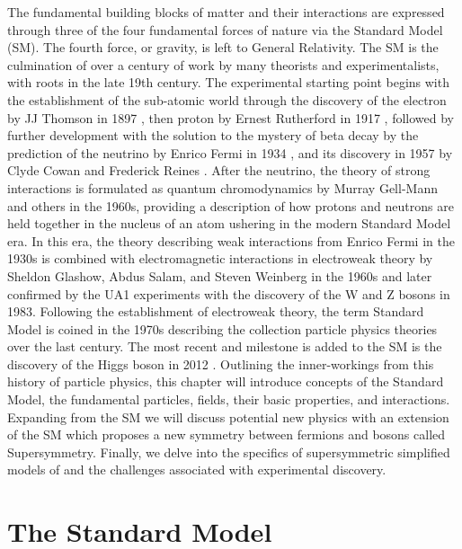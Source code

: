 The fundamental building blocks of matter and their interactions are expressed through three of the four fundamental forces of nature via the Standard Model (SM). The fourth force, or gravity, is left to General Relativity. The SM  is the culmination of over a century of work by many theorists and experimentalists, with roots in the late 19th century. The experimental starting point begins with the establishment of the sub-atomic world through the discovery of the electron by JJ Thomson in 1897 \cite{Thomson:1897cm}, then proton by Ernest Rutherford in 1917 \cite{Rutherford:1911zz}, followed by further development with the solution to the mystery of beta decay by the prediction of the neutrino by Enrico Fermi in 1934 \cite{Fermi:1934hr}, and its discovery in 1957 by Clyde Cowan and Frederick Reines \cite{Reines:1956rs}.  After the neutrino,  the theory of strong interactions is formulated as quantum chromodynamics by Murray Gell-Mann and others in the 1960s, providing a description of how protons and neutrons are held together in the nucleus of an atom \cite{GellMann:1964nj} ushering in the modern Standard Model era. In this era, the theory describing weak interactions from Enrico Fermi in the 1930s is combined with electromagnetic interactions in electroweak theory by Sheldon Glashow, Abdus Salam, and Steven Weinberg in the 1960s \cite{GLASHOW1961579}\cite{Salam:1968rm}\cite{Weinberg:1967tq} and later confirmed by the UA1 experiments with the discovery of the W and Z bosons in 1983\cite{arnison1983experimental}\cite{glashow1984future}. Following the establishment of electroweak theory, the term Standard Model is coined in the 1970s describing the collection particle physics theories over the last century. The most recent and milestone is added to the SM is the discovery of the Higgs boson in 2012 \cite{hCMS:2012qbp}\cite{ATLAS:2012yve}.  Outlining the inner-workings from this history of particle physics, this chapter will introduce concepts of the Standard Model, the fundamental particles, fields, their basic properties, and interactions. Expanding from the  SM we will discuss potential new physics with an extension of the SM which proposes a new symmetry between fermions and bosons called Supersymmetry. Finally, we delve into the specifics of supersymmetric simplified models of and the challenges associated with experimental discovery.



\section{The Standard Model}

